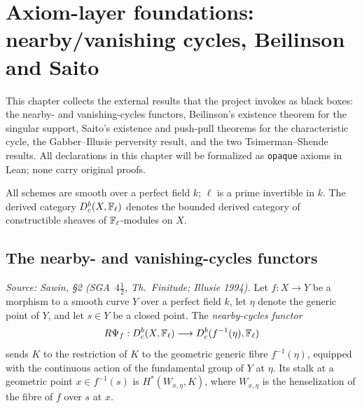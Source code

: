 
\section{Axiom-layer foundations: nearby/vanishing cycles, Beilinson and Saito}

This chapter collects the external results that the project invokes as black boxes:
the nearby- and vanishing-cycles functors, Beilinson's existence theorem for the
singular support, Saito's existence and push-pull theorems for the characteristic
cycle, the Gabber--Illusie perversity result, and the two Tsimerman--Shende results.
All declarations in this chapter will be formalized as \texttt{opaque} axioms in
Lean; none carry original proofs.

All schemes are smooth over a perfect field $k$; $\ell$ is a prime invertible in
$k$.  The derived category $D^b_c(X,\mathbb{F}_\ell)$ denotes the bounded derived category
of constructible sheaves of $\mathbb{F}_\ell$-modules on $X$.

\subsection{The nearby- and vanishing-cycles functors}

\begin{definition}
  \label{def:nearby_cycles}
  \textit{Source: Sawin, §2 (SGA~$4\tfrac{1}{2}$, Th.\ Finitude; Illusie 1994).}
  Let $f:X\to Y$ be a morphism to a smooth curve $Y$ over a perfect field $k$, let
  $\eta$ denote the generic point of $Y$, and let $s\in Y$ be a closed point.  The
  \emph{nearby-cycles functor}
  \[ R\Psi_f : D^b_c(X,\mathbb{F}_\ell) \longrightarrow D^b_c(f^{-1}(\eta),\mathbb{F}_\ell) \]
  sends $K$ to the restriction of $K$ to the geometric generic fibre $f^{-1}(\eta)$,
  equipped with the continuous action of the fundamental group of $Y$ at $\eta$.  Its
  stalk at a geometric point $x\in f^{-1}(s)$ is $H^*(W_{x,\eta},K)$, where
  $W_{x,\eta}$ is the henselization of the fibre of $f$ over $s$ at $x$.
\end{definition}

